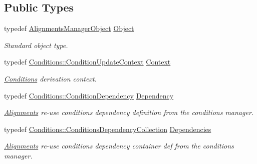 \subsection*{Public Types}
\begin{DoxyCompactItemize}
\item 
typedef \hyperlink{class_d_d4hep_1_1_alignments_1_1_alignments_manager_object}{AlignmentsManagerObject} \hyperlink{class_d_d4hep_1_1_alignments_1_1_alignments_manager_a45f94880f4e49efe8e77ce6d8e45275f}{Object}
\begin{DoxyCompactList}\small\item\em Standard object type. \item\end{DoxyCompactList}\item 
typedef \hyperlink{class_d_d4hep_1_1_conditions_1_1_condition_update_context}{Conditions::ConditionUpdateContext} \hyperlink{class_d_d4hep_1_1_alignments_1_1_alignments_manager_a6756d14a9af79dbc28296c765f6bf581}{Context}
\begin{DoxyCompactList}\small\item\em \hyperlink{namespace_d_d4hep_1_1_conditions}{Conditions} derivation context. \item\end{DoxyCompactList}\item 
typedef \hyperlink{class_d_d4hep_1_1_conditions_1_1_condition_dependency}{Conditions::ConditionDependency} \hyperlink{class_d_d4hep_1_1_alignments_1_1_alignments_manager_a62dad65e1472f8939e5a83f859e96d26}{Dependency}
\begin{DoxyCompactList}\small\item\em \hyperlink{namespace_d_d4hep_1_1_alignments}{Alignments} re-\/use conditions dependency definition from the conditions manager. \item\end{DoxyCompactList}\item 
typedef \hyperlink{class_d_d4hep_1_1_conditions_1_1_conditions_dependency_collection}{Conditions::ConditionsDependencyCollection} \hyperlink{class_d_d4hep_1_1_alignments_1_1_alignments_manager_ae8068cb8b252db1243c87eccad69e980}{Dependencies}
\begin{DoxyCompactList}\small\item\em \hyperlink{namespace_d_d4hep_1_1_alignments}{Alignments} re-\/use conditions dependency container def from the conditions manager. \item\end{DoxyCompactList}\end{DoxyCompactItemize}
